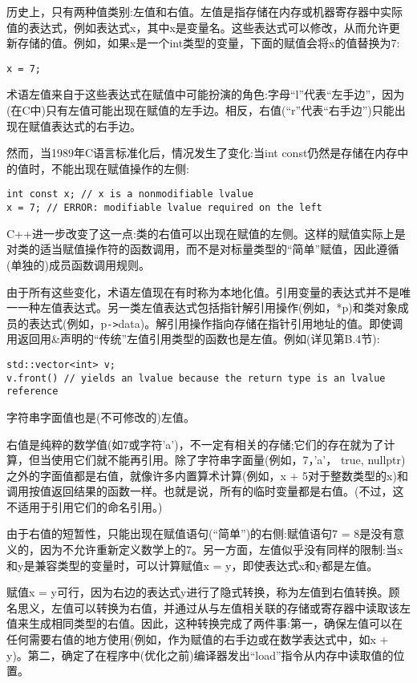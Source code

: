 
历史上，只有两种值类别:左值和右值。左值是指存储在内存或机器寄存器中实际值的表达式，例如表达式x，其中x是变量名。这些表达式可以修改，从而允许更新存储的值。例如，如果x是一个int类型的变量，下面的赋值会将x的值替换为7:

\begin{lstlisting}[style=styleCXX]
x = 7;
\end{lstlisting}

术语左值来自于这些表达式在赋值中可能扮演的角色:字母“l”代表“左手边”，因为(在C中)只有左值可能出现在赋值的左手边。相反，右值(“r”代表“右手边”)只能出现在赋值表达式的右手边。

然而，当1989年C语言标准化后，情况发生了变化:当int const仍然是存储在内存中的值时，不能出现在赋值操作的左侧:

\begin{lstlisting}[style=styleCXX]
int const x; // x is a nonmodifiable lvalue
x = 7; // ERROR: modifiable lvalue required on the left
\end{lstlisting}

C++进一步改变了这一点:类的右值可以出现在赋值的左侧。这样的赋值实际上是对类的适当赋值操作符的函数调用，而不是对标量类型的“简单”赋值，因此遵循(单独的)成员函数调用规则。

由于所有这些变化，术语左值现在有时称为本地化值。引用变量的表达式并不是唯一一种左值表达式。另一类左值表达式包括指针解引用操作(例如，*p)和类对象成员的表达式(例如，p\texttt{->}data)。解引用操作指向存储在指针引用地址的值。即使调用返回用\&声明的“传统”左值引用类型的函数也是左值。例如(详见第B.4节):

\begin{lstlisting}[style=styleCXX]
std::vector<int> v;
v.front() // yields an lvalue because the return type is an lvalue reference
\end{lstlisting}

字符串字面值也是(不可修改的)左值。

右值是纯粹的数学值(如7或字符'a')，不一定有相关的存储;它们的存在就为了计算，但当使用它们就不能再引用。除了字符串字面量(例如，7，'a'， true, nullptr)之外的字面值都是右值，就像许多内置算术计算(例如，x + 5对于整数类型的x)和调用按值返回结果的函数一样。也就是说，所有的临时变量都是右值。(不过，这不适用于引用它们的命名引用。)


由于右值的短暂性，只能出现在赋值语句(“简单”)的右侧:赋值语句7 = 8是没有意义的，因为不允许重新定义数学上的7。另一方面，左值似乎没有同样的限制:当x和y是兼容类型的变量时，可以计算赋值x = y，即使表达式x和y都是左值。

赋值x = y可行，因为右边的表达式y进行了隐式转换，称为左值到右值转换。顾名思义，左值可以转换为右值，并通过从与左值相关联的存储或寄存器中读取该左值来生成相同类型的右值。因此，这种转换完成了两件事:第一，确保左值可以在任何需要右值的地方使用(例如，作为赋值的右手边或在数学表达式中，如x + y)。第二，确定了在程序中(优化之前)编译器发出“load”指令从内存中读取值的位置。


















